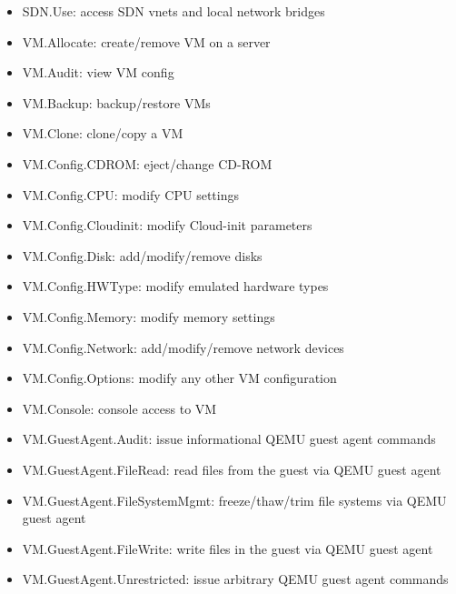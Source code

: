 \begin{itemize}[leftmargin=2cm]

	\item SDN.Use: access SDN vnets and local network bridges

	\item VM.Allocate: create/remove VM on a server

	\item VM.Audit: view VM config

	\item VM.Backup: backup/restore VMs

	\item VM.Clone: clone/copy a VM

	\item VM.Config.CDROM: eject/change CD-ROM

	\item VM.Config.CPU: modify CPU settings

	\item VM.Config.Cloudinit: modify Cloud-init parameters

	\item VM.Config.Disk: add/modify/remove disks

	\item VM.Config.HWType: modify emulated hardware types

	\item VM.Config.Memory: modify memory settings

	\item VM.Config.Network: add/modify/remove network devices

	\item VM.Config.Options: modify any other VM configuration

	\item VM.Console: console access to VM

	\item VM.GuestAgent.Audit: issue informational QEMU guest agent commands

	\item VM.GuestAgent.FileRead: read files from the guest via QEMU guest agent

	\item VM.GuestAgent.FileSystemMgmt: freeze/thaw/trim file systems via QEMU guest agent

	\item VM.GuestAgent.FileWrite: write files in the guest via QEMU guest agent

	\item VM.GuestAgent.Unrestricted: issue arbitrary QEMU guest agent commands


\end{itemize}
